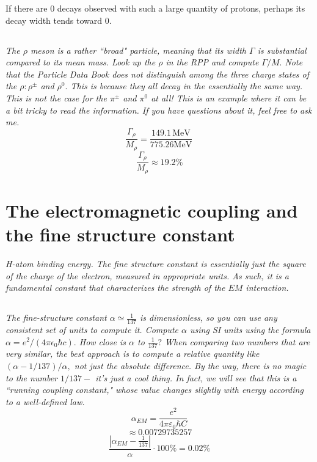 \documentclass[12pt, letterpaper]{article}
\begin{document}
If there are 0 decays observed with such a large quantity of protons, perhaps its decay width tends toward 0.

\subsection{}
\textit{The $\rho$ meson is a rather ``broad" particle, meaning that its width $\Gamma$ is substantial compared to its mean mass. Look up the $\rho$ in the RPP and compute $\Gamma / M .$ Note that the Particle Data Book does not distinguish among the three charge states of the $\rho: \rho^{\pm}$ and $\rho^{0} .$ This is because they all decay in the essentially the same way. This is not the case for the $\pi^{\pm}$ and $\pi^{0}$ at all! This is an example where it can be a bit tricky to read the information. If you have questions about it, feel free to ask me.}
$$
\frac{\Gamma_{\rho}}{M_{\rho}}=\frac{149.1\, \mathrm{MeV}}{775.26 \mathrm{MeV}}\,
$$
$$
\frac{\Gamma_{\rho}}{M_{\rho}}\approx19.2 \%
$$

\section{The electromagnetic coupling and the fine structure constant}
\textit{H-atom binding energy. The fine structure constant is essentially just the square of the charge of the electron, measured in appropriate units. As such, it is a fundamental constant that characterizes the strength of the $EM$ interaction.}

\subsection{}
\textit{The fine-structure constant $\alpha \simeq \frac{1}{137}$ is dimensionless, so you can use any consistent set of units to compute it. Compute $\alpha$ using SI units using the formula $\alpha=e^{2} /\left(4 \pi \epsilon_{0} \hbar c\right) .$ How close is $\alpha$ to $\frac{1}{137} ?$ When comparing two numbers that are very similar, the best approach is to compute a relative quantity like $(\alpha-1 / 137) / \alpha,$ not just the absolute difference. By the way, there is no magic to the number $1 / 137-$ it's just a cool thing. In fact, we will see that this is a ``running coupling constant," whose value changes slightly with energy according to a well-defined law.}
$$
\alpha_{E M}=\frac{e^{2}}{4 \pi \varepsilon_{0}\hbar C}
$$
$$
\approx 0.00729735257
$$
$$
\boxed{
\frac{\left|\alpha_{EM}-\frac{1}{137}\right|}{\alpha} \cdot 100 \%=0.02 \%}
$$
\end{document}
